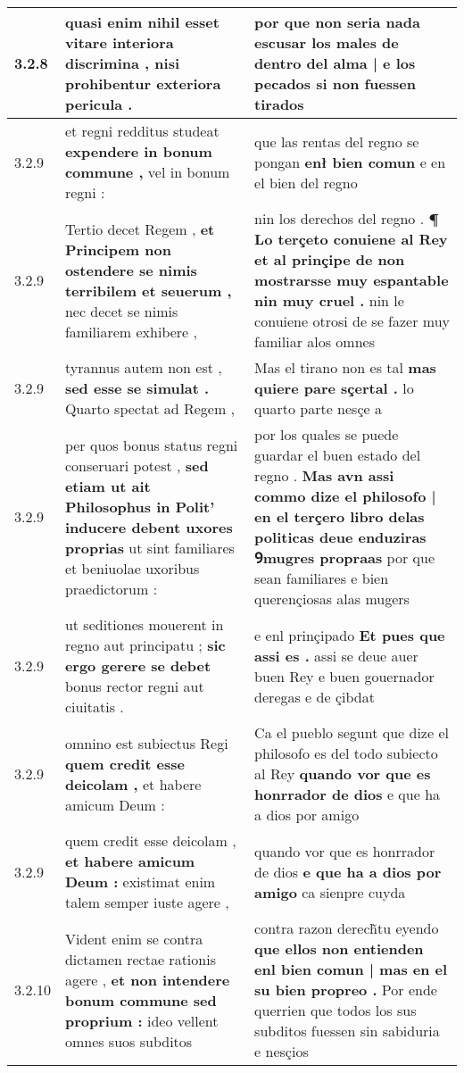 \begin{tabular}{|p{1cm}|p{6.5cm}|p{6.5cm}|}
3.2.8 & quasi enim nihil esset \textbf{ vitare interiora discrimina , } nisi prohibentur exteriora pericula . & por que non seria nada escusar los males \textbf{ de dentro del alma | e los pecados } si non fuessen tirados \\\hline
3.2.9 & et regni redditus studeat \textbf{ expendere in bonum commune , } vel in bonum regni : & que las rentas del regno se pongan \textbf{ enł bien comun } e en el bien del regno \\\hline
3.2.9 & Tertio decet Regem , \textbf{ et Principem non ostendere se nimis terribilem et seuerum , } nec decet se nimis familiarem exhibere , & nin los derechos del regno . \textbf{ ¶ Lo terçeto conuiene al Rey et al prinçipe de non mostrarsse muy espantable nin muy cruel . } nin le conuiene otrosi de se fazer muy familiar alos omnes \\\hline
3.2.9 & tyrannus autem non est , \textbf{ sed esse se simulat . } Quarto spectat ad Regem , & Mas el tirano non es tal \textbf{ mas quiere pare sçertal . } lo quarto parte nesçe a \\\hline
3.2.9 & per quos bonus status regni conseruari potest , \textbf{ sed etiam ut ait Philosophus in Polit’ inducere debent uxores proprias } ut sint familiares et beniuolae uxoribus praedictorum : & por los quales se puede guardar el buen estado del regno . \textbf{ Mas avn assi commo dize el philosofo | en el terçero libro delas politicas deue enduziras Ꝯmugres propraas } por que sean familiares e bien querençiosas alas mugers \\\hline
3.2.9 & ut seditiones mouerent in regno aut principatu ; \textbf{ sic ergo gerere se debet } bonus rector regni aut ciuitatis . & e enl prinçipado \textbf{ Et pues que assi es . } assi se deue auer buen Rey e buen gouernador deregas e de çibdat \\\hline
3.2.9 & omnino est subiectus Regi \textbf{ quem credit esse deicolam , } et habere amicum Deum : & Ca el pueblo segunt que dize el philosofo es del todo subiecto al Rey \textbf{ quando vor que es honrrador de dios } e que ha a dios por amigo \\\hline
3.2.9 & quem credit esse deicolam , \textbf{ et habere amicum Deum : } existimat enim talem semper iuste agere , & quando vor que es honrrador de dios \textbf{ e que ha a dios por amigo } ca sienpre cuyda \\\hline
3.2.10 & Vident enim se contra dictamen rectae rationis agere , \textbf{ et non intendere bonum commune sed proprium : } ideo vellent omnes suos subditos & contra razon derech̃tu eyendo \textbf{ que ellos non entienden enl bien comun | mas en el su bien propreo . } Por ende querrien que todos los sus subditos fuessen sin sabiduria e nesçios \\\hline

\end{tabular}
